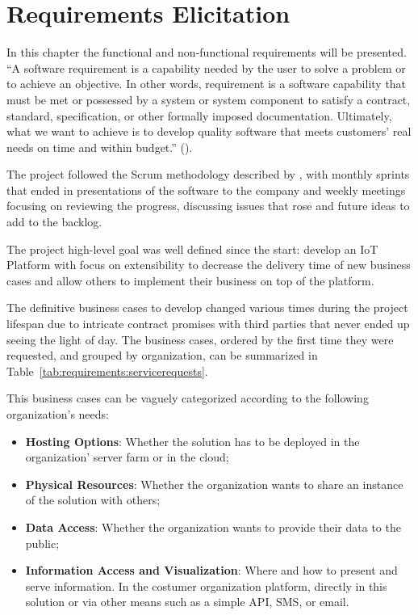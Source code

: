 \chapter{Requirements Elicitation}
\label{chap:requirements}

In this chapter the functional and non-functional requirements will be presented. ``A software requirement is a capability needed by the user to solve a problem or to achieve an objective. In other words, requirement is a software capability that must be met or possessed by a system or system component to satisfy a contract, standard, specification, or other formally imposed documentation. Ultimately, what we want to achieve is to develop quality software that meets customers' real needs on time and within budget.'' (\cite{req}).

The project followed the Scrum methodology described by \cite{schwaber1997scrum}, with monthly sprints that ended in presentations of the software to the company and weekly meetings focusing on reviewing the progress, discussing issues that rose and future ideas to add to the backlog.

The project high-level goal was well defined since the start: develop an IoT Platform with focus on extensibility to decrease the delivery time of new business cases and allow others to implement their business on top of the platform.

The definitive business cases to develop changed various times during the project lifespan due to intricate contract promises with third parties that never ended up seeing the light of day. The business cases, ordered by the first time they were requested, and grouped by organization, can be summarized in Table~\ref{tab:requirements:servicerequests}.

This business cases can be vaguely categorized according to the following organization's needs:

\begin{itemize}
    \item \textbf{Hosting Options}: Whether the solution has to be deployed in the organization' server farm or in the cloud;
    \item \textbf{Physical Resources}: Whether the organization wants to share an instance of the solution with others;
    \item \textbf{Data Access}: Whether the organization wants to provide their data to the public;
    \item \textbf{Information Access and Visualization}: Where and how to present and serve information. In the costumer organization platform, directly in this solution or via other means such as a simple \gls{API}, SMS, or email.
\end{itemize}

